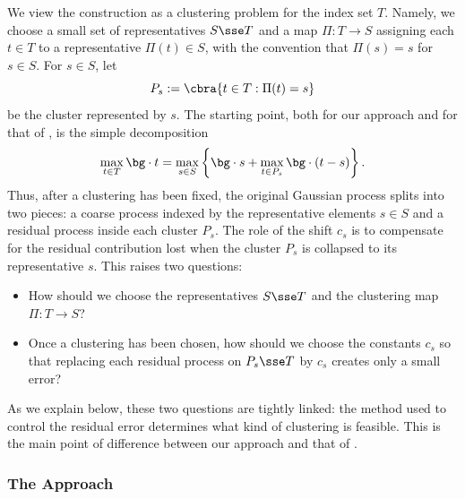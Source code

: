 \documentclass[11pt]{article}
\begin{document}
We view the construction as a clustering problem for the index set $T$.
Namely, we choose a small set of representatives $S\sse T$ and a map $\Pi:T\to S$ assigning each $t\in T$ to a representative $\Pi(t)\in S$, with the convention that $\Pi(s) = s$ for $s \in S$. 
For $s\in S$, let  
\[
	P_s:=\cbra{t\in T:\Pi(t)=s}
\]
be the cluster represented by $s$. 
The starting point, both for our approach and for that of \cite{de2026sparsifying}, is the simple decomposition 
\begin{equation} \label{eq:intro-simple-decomp}
	\max_{t\in T}\bg\cdot t
	=
	\max_{s\in S}
	\left\{
		\bg\cdot s
		+
		\max_{t\in P_s}\bg\cdot (t-s)
	\right\}.
\end{equation}
Thus, after a clustering has been fixed, the original Gaussian process splits into two pieces: a coarse process indexed by the representative elements $s\in S$ and a residual process inside each cluster $P_s$. 
The role of the shift $c_s$ is to compensate for the residual contribution lost when the cluster $P_s$ is collapsed to its representative $s$.  
This raises two questions:  
\begin{itemize}
	\item How should we choose the representatives $S\sse T$ and the clustering map $\Pi:T\to S$?
	\item Once a clustering has been chosen, how should we choose the constants $c_s$ so that replacing each residual process on $P_s \sse T$ by $c_s$ creates only a small error?
\end{itemize}
As we explain below, these two questions are tightly linked: the method used to control the residual error determines what kind of clustering is feasible. 
This is the main point of difference between our approach and that of \cite{de2026sparsifying}. 

\subsubsection{The \cite{de2026sparsifying} Approach} 
\label{subsubsec:DNOS-approach}
\end{document}
